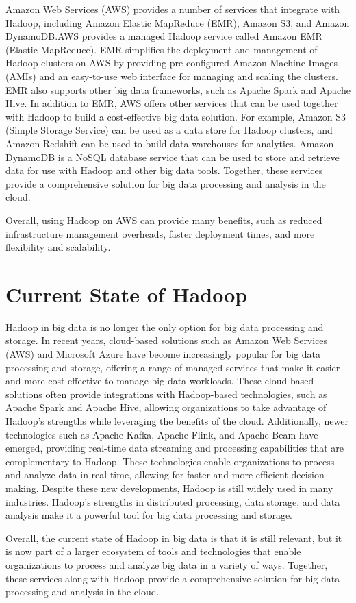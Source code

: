 \documentclass[12pt]{article}
\begin{document}
Amazon Web Services (AWS) provides a number of services that integrate with Hadoop, including Amazon Elastic MapReduce (EMR), Amazon S3, and Amazon DynamoDB.AWS provides a managed Hadoop service called Amazon EMR (Elastic MapReduce). EMR simplifies the deployment and management of Hadoop clusters on AWS by providing pre-configured Amazon Machine Images (AMIs) and an easy-to-use web interface for managing and scaling the clusters. EMR also supports other big data frameworks, such as Apache Spark and Apache Hive. In addition to EMR, AWS offers other services that can be used together with Hadoop to build a cost-effective big data solution. For example, Amazon S3 (Simple Storage Service) can be used as a data store for Hadoop clusters, and Amazon Redshift can be used to build data warehouses for analytics. Amazon DynamoDB is a NoSQL database service that can be used to store and retrieve data for use with Hadoop and other big data tools. Together, these services provide a comprehensive solution for big data processing and analysis in the cloud.

Overall, using Hadoop on AWS can provide many benefits, such as reduced infrastructure management overheads, faster deployment times, and more flexibility and scalability.

  
\section{Current State of Hadoop}
Hadoop in big data is no longer the only option for big data processing and storage. In recent years, cloud-based solutions such as Amazon Web Services (AWS) and Microsoft Azure have become increasingly popular for big data processing and storage, offering a range of managed services that make it easier and more cost-effective to manage big data workloads. These cloud-based solutions often provide integrations with Hadoop-based technologies, such as Apache Spark and Apache Hive, allowing organizations to take advantage of Hadoop's strengths while leveraging the benefits of the cloud. Additionally, newer technologies such as Apache Kafka, Apache Flink, and Apache Beam have emerged, providing real-time data streaming and processing capabilities that are complementary to Hadoop. These technologies enable organizations to process and analyze data in real-time, allowing for faster and more efficient decision-making. Despite these new developments, Hadoop is still widely used in many industries. Hadoop's strengths in distributed processing, data storage, and data analysis make it a powerful tool for big data processing and storage.

Overall, the current state of Hadoop in big data is that it is still relevant, but it is now part of a larger ecosystem of tools and technologies that enable organizations to process and analyze big data in a variety of ways. Together, these services along with Hadoop provide a comprehensive solution for big data processing and analysis in the cloud.
\end{document}
